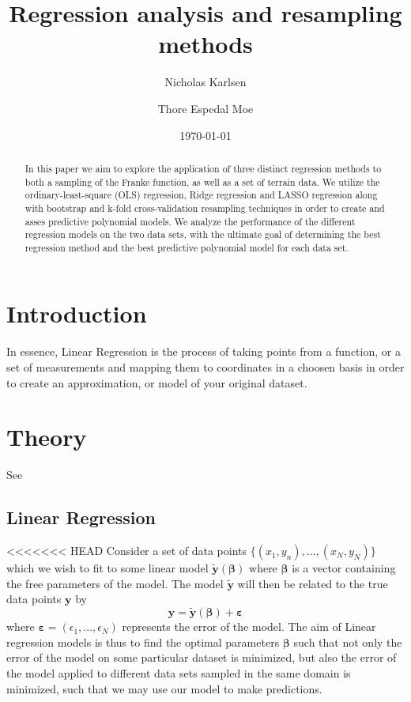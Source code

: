\documentclass[reprint, english, nofootinbib]{revtex4-2}
\begin{document}
\title{Regression analysis and resampling methods}
\author{Nicholas Karlsen}
\author{Thore Espedal Moe}
\date{\today}

\begin{abstract}
   In this paper we aim to explore the application of three distinct regression methods to both a sampling of the Franke function, as well as a set of terrain data. We utilize the ordinary-least-square (OLS) regression, Ridge regression and LASSO regression along with bootstrap and k-fold cross-validation resampling techniques in order to create and asses predictive polynomial models. We analyze the performance of the different regression models on the two data sets, with the ultimate goal of determining the best regression method and the best predictive polynomial model for each data set.
\end{abstract}

\maketitle

\section{Introduction}
    \noindent
    In essence, Linear Regression is the process of taking points from a function, or a set of measurements and mapping them to coordinates in a choosen basis in order to create an approximation, or model of your original dataset.
\section{Theory}
    See \textcite{hastie}
    \subsection{Linear Regression}
<<<<<<< HEAD
        \noindent
        Consider a set of data points $\{(x_1, y_n), \dots, (x_N, y_N)\}$ which we wish to fit to some linear model $\mathbf{\tilde y}(\pmb \beta)$ where $\pmb\beta$ is a vector containing the free parameters of the model. The model $\mathbf{\tilde y}$ will then be related to the true data points $\mathbf y$ by
        \begin{equation}
            \mathbf y = \mathbf{\tilde y}(\pmb\beta) + \pmb\varepsilon
        \end{equation}
        where $\pmb\varepsilon = (\epsilon_1, \dots, \epsilon_N)$ represents the error of the model. The aim of Linear regression models is thus to find the optimal parameters $\pmb\beta$ such that not only the error of the model on some particular dataset is minimized, but also the error of the model applied to different data sets sampled in the same domain is minimized, such that we may use our model to make predictions.
\end{document}
